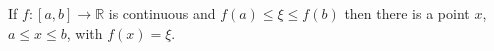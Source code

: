 If $f: [a, b] \to \mathbb{R}$ is continuous and $f(a) \leq \xi \leq f(b)$ then there is a point $x$, $a \leq x \leq b$, with $f(x) = \xi$.
